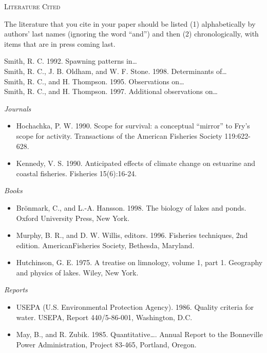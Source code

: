 \documentclass[11pt]{article}
\newcommand{\VSpace}{\vspace{\baselineskip}}
\begin{document}
\begin{enumerate}
	\VSpace
	\textsc{Literature Cited}
		
	The literature that you cite in your paper should be listed (1) alphabetically by authors’ last names (ignoring the word “and”) and then (2) chronologically, with items that are in press coming last.
	
	Smith, R. C. 1992. Spawning patterns in\dots \\
	Smith, R. C., J. B. Oldham, and W. F. Stone. 1998. Determinants of\dots \\
	Smith, R. C., and H. Thompson. 1995. Observations on\dots \\
	Smith, R. C., and H. Thompson. 1997. Additional observations on\dots
	
	\VSpace
	\emph{Journals}
	\begin{itemize}[label={}, leftmargin=1.5em, itemindent=-1.5em]
		\item Hochachka, P. W. 1990. Scope for survival: a conceptual “mirror” to Fry’s scope for activity. Transactions of the American Fisheries Society 119:622-628.	
		\item Kennedy, V. S. 1990. Anticipated effects of climate change on estuarine and coastal fisheries. Fisheries 15(6):16-24.
	\end{itemize}
	
	\emph{Books}
	\begin{itemize}[label={}, leftmargin=1.5em, itemindent=-1.5em]
		\item Brönmark, C., and L.-A. Hansson. 1998. The biology of lakes and ponds. Oxford University Press, New York.
		\item Murphy, B. R., and D. W. Willis, editors. 1996. Fisheries techniques, 2nd edition. AmericanFisheries Society, Bethesda, Maryland.
		\item Hutchinson, G. E. 1975. A treatise on limnology, volume 1, part 1. Geography and physics of lakes. Wiley, New York.
	\end{itemize}	
	
	\emph{Reports}
	\begin{itemize}[label={}, leftmargin=1.5em, itemindent=-1.5em]
		\item USEPA (U.S. Environmental Protection Agency). 1986. Quality criteria for water. USEPA, Report 440/5-86-001, Washington, D.C.
		\item May, B., and R. Zubik. 1985. Quantitative\dots. Annual Report to the Bonneville Power Administration, Project 83-465, Portland, Oregon.
	\end{itemize}
	

\end{enumerate}
\end{document}
